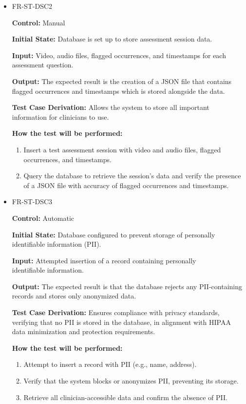 \documentclass[12pt, titlepage]{article}
\begin{document}
\begin{itemize}
  \item FR-ST-DSC2
  \begin{mdframed}[linewidth=0.5mm]
      \textbf{Control:} Manual \par
      \textbf{Initial State:} Database is set up to store assessment session data. \par
      \textbf{Input:} Video, audio files, flagged occurrences, and timestamps for each assessment question. \par
      \textbf{Output:} The expected result is the creation of a JSON file that contains flagged occurrences and timestamps which is stored alongside the data. \par
      \textbf{Test Case Derivation:} Allows the system to store all important information for clinicians to use. \par
      \textbf{How the test will be performed:}
      \begin{enumerate}[noitemsep]
        \item Insert a test assessment session with video and audio files, flagged \\ occurrences, and timestamps.
        \item Query the database to retrieve the session’s data and verify the presence of a JSON file with accuracy of flagged occurrences and timestamps.
      \end{enumerate}
  \end{mdframed}

  \item FR-ST-DSC3
  \begin{mdframed}[linewidth=0.5mm]
      \textbf{Control:} Automatic \par
      \textbf{Initial State:} Database configured to prevent storage of personally identifiable information (PII). \par
      \textbf{Input:} Attempted insertion of a record containing personally \\identifiable information. \par
      \textbf{Output:} The expected result is that the database rejects any PII-containing records and stores only anonymized data. \par
      \textbf{Test Case Derivation:} Ensures compliance with privacy standards, verifying that no PII is stored in the database, in alignment with HIPAA data minimization and protection requirements. \par
      \textbf{How the test will be performed:}
      \begin{enumerate}[noitemsep]
        \item Attempt to insert a record with PII (e.g., name, address).
        \item Verify that the system blocks or anonymizes PII, preventing its storage.
        \item Retrieve all clinician-accessible data and confirm the absence of PII.
      \end{enumerate}
  \end{mdframed}


\end{itemize}
\end{document}
